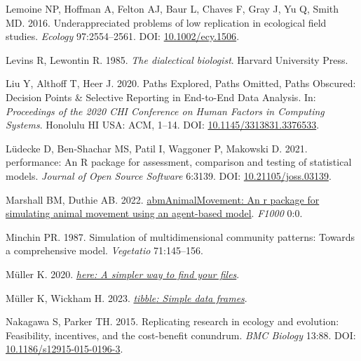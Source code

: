 \documentclass[10pt,a4paper]{article}
\newlength{\cslhangindent}
\newlength{\cslentryspacingunit} %
\newenvironment{CSLReferences}[2] %
 {%
  \setlength{\parindent}{0pt}
  \ifodd #1
  \let\oldpar\par
  \def\par{\hangindent=\cslhangindent\oldpar}
  \fi
  \setlength{\parskip}{#2\cslentryspacingunit}
 }%
 {}
\begin{document}
\begin{CSLReferences}{1}{0}
\leavevmode{}%
Lemoine NP, Hoffman A, Felton AJ, Baur L, Chaves F, Gray J, Yu Q, Smith MD. 2016. Underappreciated problems of low replication in ecological field studies. \emph{Ecology} 97:2554--2561. DOI: \href{https://doi.org/10.1002/ecy.1506}{10.1002/ecy.1506}.

\leavevmode{}%
Levins R, Lewontin R. 1985. \emph{The dialectical biologist}. Harvard University Press.

\leavevmode{}%
Liu Y, Althoff T, Heer J. 2020. Paths {Explored}, {Paths} {Omitted}, {Paths} {Obscured}: {Decision} {Points} \& {Selective} {Reporting} in {End}-to-{End} {Data} {Analysis}. In: \emph{Proceedings of the 2020 {CHI} {Conference} on {Human} {Factors} in {Computing} {Systems}}. Honolulu HI USA: ACM, 1--14. DOI: \href{https://doi.org/10.1145/3313831.3376533}{10.1145/3313831.3376533}.

\leavevmode{}%
Lüdecke D, Ben-Shachar MS, Patil I, Waggoner P, Makowski D. 2021. {performance}: An {R} package for assessment, comparison and testing of statistical models. \emph{Journal of Open Source Software} 6:3139. DOI: \href{https://doi.org/10.21105/joss.03139}{10.21105/joss.03139}.

\leavevmode{}%
Marshall BM, Duthie AB. 2022. \href{https://0}{{abmAnimalMovement}: An r package for simulating animal movement using an agent-based model}. \emph{F1000} 0:0.

\leavevmode{}%
Minchin PR. 1987. Simulation of multidimensional community patterns: Towards a comprehensive model. \emph{Vegetatio} 71:145--156.

\leavevmode{}%
Müller K. 2020. \emph{\href{https://CRAN.R-project.org/package=here}{{here}: A simpler way to find your files}}.

\leavevmode{}%
Müller K, Wickham H. 2023. \emph{\href{https://CRAN.R-project.org/package=tibble}{{tibble}: Simple data frames}}.

\leavevmode{}%
Nakagawa S, Parker TH. 2015. Replicating research in ecology and evolution: Feasibility, incentives, and the cost-benefit conundrum. \emph{BMC Biology} 13:88. DOI: \href{https://doi.org/10.1186/s12915-015-0196-3}{10.1186/s12915-015-0196-3}.


\end{CSLReferences}
\end{document}
